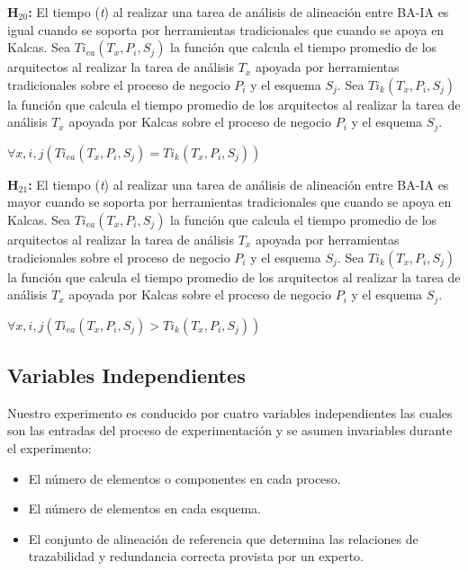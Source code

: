 \textbf{H$_{20}$:} El tiempo (\textit{t}) al realizar una tarea de an\'alisis de alineaci\'on entre BA-IA es igual cuando se soporta por herramientas tradicionales que cuando se apoya en Kalcas. Sea $Ti_{ea}(T_{x}, P_{i},S_{j})$ la funci\'on que calcula el tiempo promedio de los arquitectos al realizar la tarea de an\'alisis $T_{x}$ apoyada por herramientas tradicionales sobre el proceso de negocio $P_{i}$ y el esquema $S_{j}$. Sea $Ti_{k}(T_{x}, P_{i},S_{j})$ la funci\'on que calcula el tiempo promedio de los arquitectos al realizar la tarea de an\'alisis $T_{x}$ apoyada por Kalcas sobre el proceso de negocio $P_{i}$ y el esquema $S_{j}$.

\begin{center}
	\begin{math}
 \forall{x,i,j}(Ti_{ea}(T_{x}, P_{i},S_{j}) = Ti_{k}(T_{x}, P_{i},S_{j}))
	\end{math}
\end{center}

\textbf{H$_{21}$:} El tiempo (\textit{t}) al realizar una tarea de an\'alisis de alineaci\'on entre BA-IA es mayor cuando se soporta por herramientas tradicionales que cuando se apoya en Kalcas. Sea $Ti_{ea}(T_{x}, P_{i},S_{j})$ la funci\'on que calcula el tiempo promedio de los arquitectos al realizar la tarea de an\'alisis $T_{x}$ apoyada por herramientas tradicionales sobre el proceso de negocio $P_{i}$ y el esquema $S_{j}$. Sea $Ti_{k}(T_{x}, P_{i},S_{j})$ la funci\'on que calcula el tiempo promedio de los arquitectos al realizar la tarea de an\'alisis $T_{x}$ apoyada por Kalcas sobre el proceso de negocio $P_{i}$ y el esquema $S_{j}$.

\begin{center}
	\begin{math}
 \forall{x,i,j}(Ti_{ea}(T_{x}, P_{i},S_{j}) > Ti_{k}(T_{x}, P_{i},S_{j}))
	\end{math}
\end{center}



\subsection{Variables Independientes}

Nuestro experimento es conducido por cuatro variables independientes las cuales son las entradas del proceso de experimentaci\'on y se asumen invariables durante el experimento: 
\begin{itemize}
\item El n\'umero de elementos o componentes en cada proceso.
\item El n\'umero de elementos en cada esquema.
\item El conjunto de alineaci\'on de referencia que determina las relaciones de trazabilidad y redundancia correcta provista por un experto.
\end{itemize}

